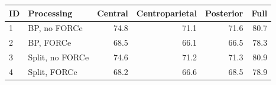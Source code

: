 \begin{tabular}{@{}llrrrr@{}}
\toprule
ID & Processing & Central & Centroparietal & Posterior & Full \\
\midrule
1 & BP, no FORCe & 74.8 & 71.1 & 71.6 & 80.7 \\
2 & BP, FORCe & 68.5 & 66.1 & 66.5 & 78.3 \\
3 & Split, no FORCe & 74.6 & 71.2 & 71.3 & 80.9 \\
4 & Split, FORCe & 68.2 & 66.6 & 68.5 & 78.9 \\
\bottomrule
\end{tabular}

